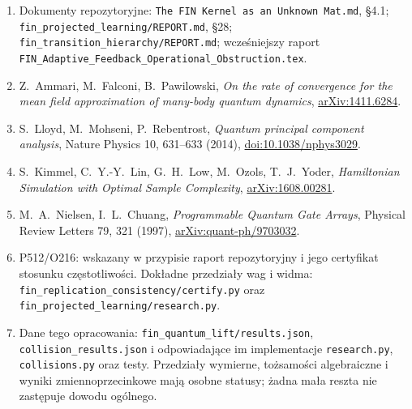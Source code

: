 \documentclass[11pt,a4paper]{article}
\begin{document}
\begin{enumerate}
\item Dokumenty repozytoryjne: \texttt{The FIN Kernel as an Unknown Mat.md},
§4.1; \texttt{fin\_projected\_learning/REPORT.md}, §28;
\texttt{fin\_transition\_hierarchy/REPORT.md}; wcześniejszy raport
\texttt{FIN\_Adaptive\_Feedback\_Operational\_Obstruction.tex}.
\item Z.~Ammari, M.~Falconi, B.~Pawilowski,
\emph{On the rate of convergence for the mean field approximation of
many-body quantum dynamics}, \href{https://arxiv.org/abs/1411.6284}{arXiv:1411.6284}.
\item S.~Lloyd, M.~Mohseni, P.~Rebentrost,
\emph{Quantum principal component analysis}, Nature Physics 10,
631--633 (2014), \href{https://doi.org/10.1038/nphys3029}{doi:10.1038/nphys3029}.
\item S.~Kimmel, C.~Y.-Y.~Lin, G.~H.~Low, M.~Ozols, T.~J.~Yoder,
\emph{Hamiltonian Simulation with Optimal Sample Complexity},
\href{https://arxiv.org/abs/1608.00281}{arXiv:1608.00281}.
\item M.~A.~Nielsen, I.~L.~Chuang,
\emph{Programmable Quantum Gate Arrays}, Physical Review Letters 79,
321 (1997), \href{https://arxiv.org/abs/quant-ph/9703032}{arXiv:quant-ph/9703032}.
\item P512/O216: wskazany w przypisie raport repozytoryjny i jego
certyfikat stosunku częstotliwości. Dokładne przedziały wag i widma:
\texttt{fin\_replication\_consistency/certify.py} oraz
\texttt{fin\_projected\_learning/research.py}.
\item Dane tego opracowania: \texttt{fin\_quantum\_lift/results.json},
\texttt{collision\_results.json} i odpowiadające im implementacje
\texttt{research.py}, \texttt{collisions.py} oraz testy.
Przedziały wymierne, tożsamości algebraiczne i wyniki zmiennoprzecinkowe
mają osobne statusy; żadna mała reszta nie zastępuje dowodu ogólnego.
\end{enumerate}
\end{document}
